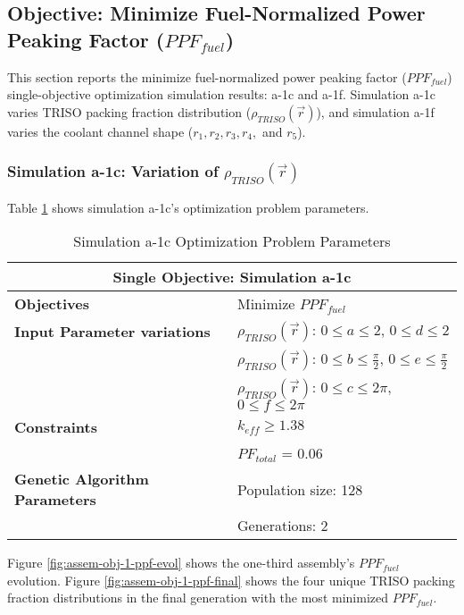 \subsection{Objective: Minimize Fuel-Normalized Power Peaking Factor ($PPF_{fuel}$)}
\label{sec:assem-1-obj-ppf}
This section reports the minimize fuel-normalized power peaking factor 
($PPF_{fuel}$) single-objective optimization simulation results: a-1c and a-1f. 
Simulation a-1c varies \gls{TRISO} packing fraction distribution 
($\rho_{TRISO}(\vec{r})$), and simulation a-1f varies the coolant channel shape 
($r_1, r_2, r_3, r_4,$ and $r_5$).

\subsubsection{Simulation a-1c: Variation of $\rho_{TRISO}(\vec{r})$}
Table \ref{tab:simulationa1c} shows simulation a-1c's optimization problem parameters. 
\begin{table}[htbp!]
    \centering
    \onehalfspacing
    \caption{Simulation a-1c Optimization Problem Parameters}
	\label{tab:simulationa1c}
    \footnotesize
    \begin{tabular}{l|p{5.3cm}}
    \hline 
    \multicolumn{2}{c}{\textbf{Single Objective: Simulation a-1c}} \\
    \hline 
    \textbf{Objectives} & Minimize $PPF_{fuel}$ \\
    \hline 
    \textbf{Input Parameter variations}
    & $\rho_{TRISO}(\vec{r})$: $0 \leq a \leq 2$, $0 \leq d \leq 2$\\
    & $\rho_{TRISO}(\vec{r})$: $0 \leq b \leq \frac{\pi}{2}$, $0 \leq e \leq \frac{\pi}{2}$\\
    & $\rho_{TRISO}(\vec{r})$: $0 \leq c \leq 2\pi$, $0 \leq f \leq 2\pi$\\
    \hline
    \textbf{Constraints} & $k_{eff} \geq 1.38$\\ 
    & $PF_{total}$ = 0.06 \\
    \hline 
    \textbf{Genetic Algorithm Parameters} & Population size: 128 \\
    & Generations: 2 \\
    \hline
    \end{tabular}
\end{table}
Figure \ref{fig:assem-obj-1-ppf-evol} shows the one-third assembly's $PPF_{fuel}$ 
evolution. 
Figure \ref{fig:assem-obj-1-ppf-final} shows the four unique TRISO packing fraction 
distributions in the final generation with the most minimized $PPF_{fuel}$. 
